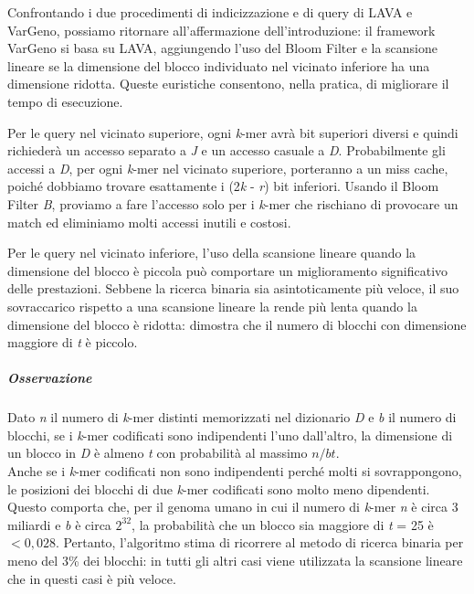 \documentclass[../main.tex]{subfiles}
\begin{document}
\noindent
Confrontando i due procedimenti di indicizzazione e di query di LAVA e VarGeno, possiamo ritornare all'affermazione dell'introduzione: il framework VarGeno si basa su LAVA, aggiungendo l'uso del Bloom Filter e la scansione lineare se la dimensione del blocco individuato nel vicinato inferiore ha una dimensione ridotta. Queste euristiche consentono, nella pratica, di migliorare il tempo di esecuzione.

Per le query nel vicinato superiore, ogni \textit{k}-mer avrà bit superiori diversi e quindi richiederà un accesso separato a \textit{J} e un accesso casuale a \textit{D}. Probabilmente gli accessi a \textit{D}, per ogni \textit{k}-mer nel vicinato superiore, porteranno a un miss cache, poiché dobbiamo trovare esattamente i (2\textit{k} - \textit{r}) bit inferiori. Usando il Bloom Filter \textit{B}, proviamo a fare l'accesso solo per i \textit{k}-mer che rischiano di provocare un match ed eliminiamo molti accessi inutili e costosi.

Per le query nel vicinato inferiore, l'uso della scansione lineare quando la dimensione del blocco è piccola può comportare un miglioramento significativo delle prestazioni. Sebbene la ricerca binaria sia asintoticamente più veloce, il suo sovraccarico rispetto a una scansione lineare la rende più lenta quando la dimensione del blocco è ridotta: \cite{sun-medvedev2018vargeno} dimostra che il numero di blocchi con dimensione maggiore di \textit{t} è piccolo. 

\subparagraph{Osservazione} Dato \textit{n} il numero di \textit{k}-mer distinti memorizzati nel dizionario \textit{D} e \textit{b} il numero di blocchi, se i \textit{k}-mer codificati sono indipendenti l'uno dall'altro, la dimensione di un blocco in \textit{D} è almeno \textit{t} con probabilità al massimo $n/bt$. \\

\noindent
Anche se i \textit{k}-mer codificati non sono indipendenti perché molti si sovrappongono, le posizioni dei blocchi di due \textit{k}-mer codificati sono molto meno dipendenti.  Questo comporta che, per il genoma umano in cui il numero di \textit{k}-mer \textit{n} è circa 3 miliardi e \textit{b} è circa $2^{32}$, la probabilità che un blocco sia maggiore di \textit{t} = 25 è $<0,028$. Pertanto, l'algoritmo stima di ricorrere al metodo di ricerca binaria per meno del 3\% dei blocchi: in tutti gli altri casi viene utilizzata la scansione lineare che in questi casi è più veloce.\\
\end{document}
